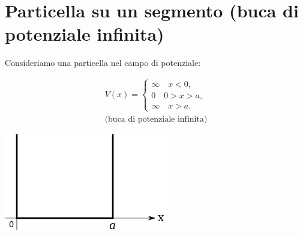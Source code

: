 \section{Particella su un segmento (buca di potenziale infinita)}
Consideriamo una particella nel campo di potenziale:\\

\begin{minipage}{.5\textwidth}
\begin{align}
V(x)= 
\begin{cases}
\infty \quad x<0,\\
0 \quad 0>x>a, \\
\infty \quad x>a.
\end{cases}
\\
\textrm{(buca di potenziale infinita)} \nonumber
\end{align}	
\end{minipage}
\hspace{.5cm}
\begin{minipage}{.4\textwidth}
\includegraphics[width=\textwidth]{immagini/cap_10/fig_10_1.png}
\end{minipage}\\


